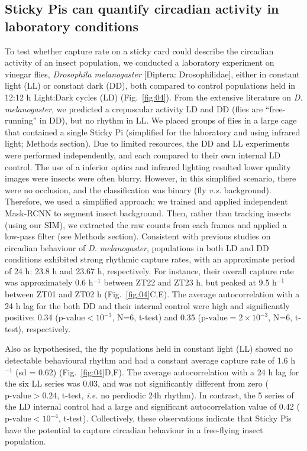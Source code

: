 \documentclass[12pt]{article}
\begin{document}
\begin{linenumbers}
		\subsection*{Sticky Pis can quantify circadian activity in laboratory conditions}
		To test whether capture rate on a sticky card could describe the circadian activity of an insect population, we conducted a laboratory experiment on vinegar flies, \emph{Drosophila melanogaster} [Diptera: Drosophilidae], either in constant light (LL) or constant dark (DD), both compared to control populations held in 12:12 h Light:Dark cycles (LD) (Fig.~\ref{fig:04}). From the extensive literature on \emph{D. melanogaster}, we predicted a crepuscular activity LD and DD (flies are “free-running” in DD), but no rhythm in LL\cite{tataroglu_studying_2014}. We placed groups of flies in a large cage that contained a single Sticky Pi (simplified for the laboratory and using infrared light; Methods section).
		Due to limited resources, the DD and LL experiments were performed independently, and each compared to their own internal LD control.
        The use of a inferior optics and infrared lighting resulted lower quality images were insects were often blurry.
        However, in this simplified scenario, there were no occlusion, and the classification was binary (fly \emph{v.s.} background).
        Therefore, we used a simplified approach: we trained and applied independent Mask-RCNN to segment insect background. 
        Then, rather than tracking insects (using our SIM), we extracted the raw counts from each frames and applied a low-pass filter (see Methods section).
		Consistent with previous studies on circadian behaviour of \emph{D. melanogaster}, populations in both LD and DD conditions exhibited strong rhythmic capture rates, with an approximate period of 24 h: 23.8 h and 23.67 h, respectively. For instance, their overall capture rate was approximately 0.6 h$^{-1}$ between ZT22 and ZT23 h, but peaked at 9.5 h$^{-1}$ between ZT01 and ZT02 h (Fig.~\ref{fig:04}C,E). 
		The average autocorrelation with a 24 h lag for the both DD and their internal control were high and significantly positive: 0.34 ($\text{p-value} < 10^{-3}$, N=6, t-test) and 0.35 ($\text{p-value} = 2 \times{} 10^{-3}$, N=6, t-test), respectively.
		
		Also as hypothesised, the fly populations held in constant light (LL) showed no detectable behavioural rhythm and had a constant average capture rate of 1.6 h$^{-1}$ (sd = 0.62) (Fig.~\ref{fig:04}D,F).
		The average autocorrelation with a 24 h lag for the six LL series was 0.03, and was not significantly different from zero ($\text{p-value} > 0.24$,  t-test, \emph{i.e.} no perdiodic 24h rhythm). In contrast, the 5 series of the LD internal control had a large and significant autocorrelation value of 0.42 ($\text{p-value} < 10^{-4}$, t-test).
		Collectively, these observations indicate that Sticky Pis have the potential to capture circadian behaviour in a free-flying insect population.
		

\end{linenumbers}
\end{document}
